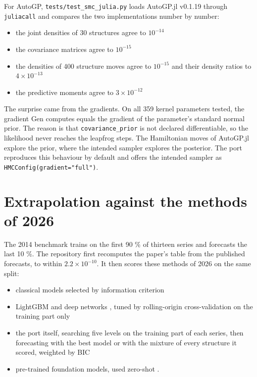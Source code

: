 \documentclass[
]{article}
\providecommand{\tightlist}{%
  \setlength{\itemsep}{0pt}\setlength{\parskip}{0pt}}
\begin{document}
For AutoGP, \texttt{tests/test\_smc\_julia.py} loads AutoGP.jl v0.1.19
through \texttt{juliacall} and compares the two implementations number
by number:

\begin{itemize}
\tightlist
\item
  the joint densities of 30 structures agree to \(10^{-14}\)
\item
  the covariance matrices agree to \(10^{-15}\)
\item
  the densities of 400 structure moves agree to \(10^{-15}\) and their
  density ratios to \(4\times10^{-13}\)
\item
  the predictive moments agree to \(3\times10^{-12}\)
\end{itemize}

The surprise came from the gradients. On all 359 kernel parameters
tested, the gradient Gen computes equals the gradient of the parameter's
standard normal prior. The reason is that \texttt{covariance\_prior} is
not declared differentiable, so the likelihood never reaches the
leapfrog steps. The Hamiltonian moves of AutoGP.jl explore the prior,
where the intended sampler explores the posterior. The port reproduces
this behaviour by default and offers the intended sampler as
\texttt{HMCConfig(gradient="full")}.

\section{Extrapolation against the methods of
2026}\label{extrapolation-against-the-methods-of-2026}

The 2014 benchmark trains on the first 90 \% of thirteen series and
forecasts the last 10 \%. The repository first recomputes the paper's
table from the published forecasts, to within \(2.2\times10^{-10}\). It
then scores these methods of 2026 on the same split:

\begin{itemize}
\tightlist
\item
  classical models selected by information criterion
  \autocite{hyndman2002ets,hyndman2008forecast,fiorucci2016theta}
\item
  LightGBM \autocite{ke2017lightgbm} and deep networks
  \autocite{oreshkin2020nbeats,challu2023nhits}, tuned by rolling-origin
  cross-validation on the training part only
\item
  the port itself, searching five levels on the training part of each
  series, then forecasting with the best model or with the mixture of
  every structure it scored, weighted by BIC
\item
  pre-trained foundation models, used zero-shot
  \autocite{ansari2024chronos,ansari2025chronos2,das2024timesfm,google2025timesfm25,mistral2026timestral,qu2026kumotabular}.
\end{itemize}
\end{document}
